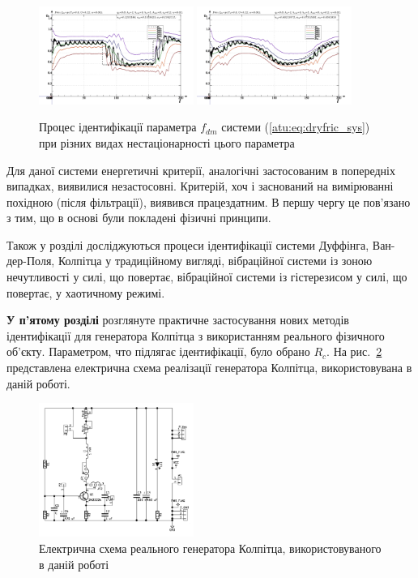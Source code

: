 \documentclass[a4paper,13pt]{atuaref}
\begin{document}
\begin{figure}[htb!]
\centerline{
  \includegraphics[width=0.45\textwidth]{p5/p/cha/fric/fric_m5p-pl_n_sign.png}
  \includegraphics[width=0.45\textwidth]{p5/p/cha/fric/fric_m5p-pl_n_sin.png}
}
\caption{
  Процес ідентифікації параметра $f_{dm}$ системи (\ref{atu:eq:dryfric_sys}) при різних видах нестаціонарності цього параметра
}
\label{atu:f:fric_id}
\end{figure}

Для даної системи енергетичні критерії, аналогічні застосованим в попередніх
випадках, виявилися незастосовні. Критерій, хоч і заснований на вимірюванні
похідною (після фільтрації), виявився працездатним. В першу чергу це пов'язано
з тим, що в основі були покладені фізичні принципи.


Також у розділі досліджуються процеси ідентифікації системи Дуффінга, Ван-дер-Поля,
Колпітца у традиційному вигляді, вібраційної системи
із зоною нечутливості у силі, що повертає, вібраційної системи
із гістерезисом у силі, що повертає, у хаотичному режимі.


\textbf{У п'ятому розділі}
розглянуте практичне застосування
нових методів ідентифікації для генератора Колпітца
з використанням реального фізичного об'єкту.
Параметром, что підлягає ідентифікації, було обрано $R_c$.
На рис.~\ref{atu:f:colp_schem_real} представлена електрична схема реалізації
генератора Колпітца, використовувана в даній роботі.

\begin{figure}[htb!]
\centerline{\includegraphics[width=0.45\textwidth]{p6/p/colp_schem_real.png} }
\caption{Електрична схема реального генератора Колпітца, використовуваного в даній роботі}
\label{atu:f:colp_schem_real}
\end{figure}
\end{document}
